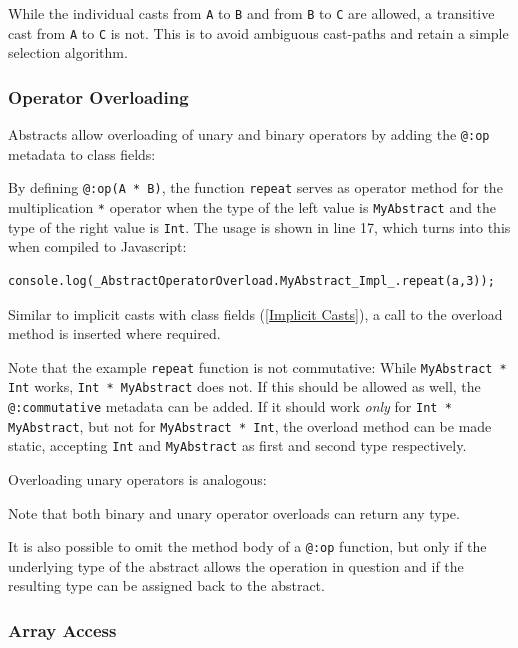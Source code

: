 \documentclass{article}
\newcommand{\target}[1]{#1}
\newcommand{\type}[1]{\texttt{#1}}
\newcommand{\expr}[1]{\texttt{#1}}
\begin{document}

While the individual casts from \type{A} to \type{B} and from \type{B} to \type{C} are allowed, a transitive cast from \type{A} to \type{C} is not. This is to avoid ambiguous cast-paths and retain a simple selection algorithm. 




\subsubsection{Operator Overloading}

Abstracts allow overloading of unary and binary operators by adding the \expr{@:op} metadata to class fields:


By defining \expr{@:op(A * B)}, the function \expr{repeat} serves as operator method for the multiplication \expr{*} operator when the type of the left value is \type{MyAbstract} and the type of the right value is \type{Int}. The usage is shown in line 17, which turns into this when compiled to \target{Javascript}:

\begin{lstlisting}
console.log(_AbstractOperatorOverload.MyAbstract_Impl_.repeat(a,3));
\end{lstlisting}
Similar to implicit casts with class fields (\cref{Implicit Casts}), a call to the overload method is inserted where required.

Note that the example \expr{repeat} function is not commutative: While \expr{MyAbstract * Int} works, \expr{Int * MyAbstract} does not. If this should be allowed as well, the \expr{@:commutative} metadata can be added. If it should work \emph{only} for \expr{Int * MyAbstract}, but not for \expr{MyAbstract * Int}, the overload method can be made static, accepting \type{Int} and \type{MyAbstract} as first and second type respectively.

Overloading unary operators is analogous:


Note that both binary and unary operator overloads can return any type.

It is also possible to omit the method body of a \expr{@:op} function, but only if the underlying type of the abstract allows the operation in question and if the resulting type can be assigned back to the abstract.


\subsubsection{Array Access}
\end{document}
